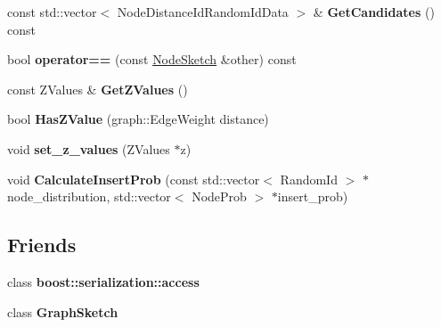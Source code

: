 \begin{DoxyCompactItemize}
\item 
\hypertarget{classall__distance__sketch_1_1NodeSketch_aab453f65996756b68a45d1773a401f3c}{}const std\+::vector$<$ Node\+Distance\+Id\+Random\+Id\+Data $>$ \& {\bfseries Get\+Candidates} () const \label{classall__distance__sketch_1_1NodeSketch_aab453f65996756b68a45d1773a401f3c}

\item 
\hypertarget{classall__distance__sketch_1_1NodeSketch_af2e6e41daf345e722eb46aed1333e7d8}{}bool {\bfseries operator==} (const \hyperlink{classall__distance__sketch_1_1NodeSketch}{Node\+Sketch} \&other) const \label{classall__distance__sketch_1_1NodeSketch_af2e6e41daf345e722eb46aed1333e7d8}

\item 
\hypertarget{classall__distance__sketch_1_1NodeSketch_ac2f6c35d3a99dbe26192a796ea783bfe}{}const Z\+Values \& {\bfseries Get\+Z\+Values} ()\label{classall__distance__sketch_1_1NodeSketch_ac2f6c35d3a99dbe26192a796ea783bfe}

\item 
\hypertarget{classall__distance__sketch_1_1NodeSketch_a2ae23f00223064c83bad0f18d3f3f1bd}{}bool {\bfseries Has\+Z\+Value} (graph\+::\+Edge\+Weight distance)\label{classall__distance__sketch_1_1NodeSketch_a2ae23f00223064c83bad0f18d3f3f1bd}

\item 
\hypertarget{classall__distance__sketch_1_1NodeSketch_a7e74a78e89d23486a7c4ba021b342ace}{}void {\bfseries set\+\_\+z\+\_\+values} (Z\+Values $\ast$z)\label{classall__distance__sketch_1_1NodeSketch_a7e74a78e89d23486a7c4ba021b342ace}

\item 
\hypertarget{classall__distance__sketch_1_1NodeSketch_a2596a7734b00e9807f1d4e1cbfe2dcaf}{}void {\bfseries Calculate\+Insert\+Prob} (const std\+::vector$<$ Random\+Id $>$ $\ast$node\+\_\+distribution, std\+::vector$<$ Node\+Prob $>$ $\ast$insert\+\_\+prob)\label{classall__distance__sketch_1_1NodeSketch_a2596a7734b00e9807f1d4e1cbfe2dcaf}

\end{DoxyCompactItemize}
\subsection*{Friends}
\begin{DoxyCompactItemize}
\item 
\hypertarget{classall__distance__sketch_1_1NodeSketch_ac98d07dd8f7b70e16ccb9a01abf56b9c}{}class {\bfseries boost\+::serialization\+::access}\label{classall__distance__sketch_1_1NodeSketch_ac98d07dd8f7b70e16ccb9a01abf56b9c}

\item 
\hypertarget{classall__distance__sketch_1_1NodeSketch_af8070bfbe7b00c7838a9a7605e361af2}{}class {\bfseries Graph\+Sketch}\label{classall__distance__sketch_1_1NodeSketch_af8070bfbe7b00c7838a9a7605e361af2}

\end{DoxyCompactItemize}


